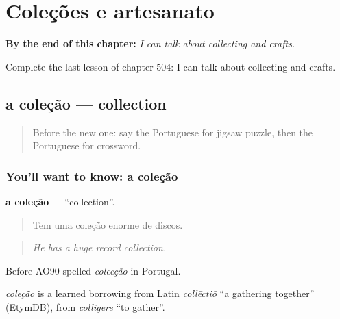 
\chapter{Coleções e artesanato}
\label{ch:pt-colecoes-e-artesanato}

\begin{chapteropening}
\textbf{By the end of this chapter:} \emph{I can talk about collecting and crafts.}

Complete the last lesson of chapter 504: I can talk about collecting and crafts.
\end{chapteropening}

\section[a coleção]{a coleção — collection}

\label{lesson:PT-C504-colecao}



\begin{quote}
Before the new one: say the Portuguese for jigsaw puzzle, then the Portuguese for crossword.
\end{quote}

\subsection*{You'll want to know: a coleção}
\textbf{a coleção} — \textquotedblleft{}collection\textquotedblright{}.

\begin{quote}
Tem uma coleção enorme de discos.
\end{quote}

\begin{quote}
\emph{He has a huge record collection.}
\end{quote}

Before AO90 spelled \emph{colecção} in Portugal.

\begin{cousinweb}
\emph{coleção} is a learned borrowing from Latin \emph{collēctiō} \textquotedblleft{}a gathering together\textquotedblright{} (EtymDB), from \emph{colligere} \textquotedblleft{}to gather\textquotedblright{}.
\end{cousinweb}

